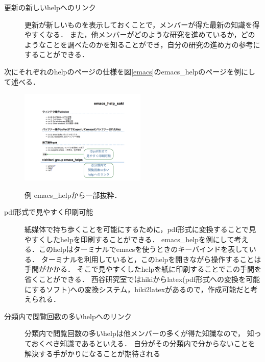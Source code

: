 \begin{description}
\item[更新の新しいhelpへのリンク]
更新が新しいものを表示しておくことで，メンバーが得た最新の知識を得やすくなる．
また，他メンバーがどのような研究を進めているか，どのようなことを調べたのかを知ることができ，自分の研究の進め方の参考にすることができる．
\end{description}

次にそれぞれのhelpのページの仕様を図\ref{emacs}のemacs\_helpのページを例にして述べる．
\begin{figure}[htbp]\begin{center}
\includegraphics[width=6cm,bb=0 0 600 800]{my_help2hiki_saki.015.png}
\caption{例 emacs\_helpから一部抜粋．}\label{emacs}
\label{default}\end{center}\end{figure}

\begin{description}

\item[pdf形式で見やすく印刷可能]
紙媒体で持ち歩くことを可能にするために，pdf形式に変換することで見やすくしたhelpを印刷することができる．
emacs\_helpを例にして考える．このhelpはターミナルでemacsを使うときのキーバインドを表している．
ターミナルを利用していると，このhelpを開きながら操作することは手間がかかる．
そこで見やすくしたhelpを紙に印刷することでこの手間を省くことができる．
西谷研究室ではhikiからlatex(pdf形式への変換を可能にするソフト)への変換システム，hiki2latexがあるので，作成可能だと考えられる．
\end{description}

\begin{description}
\item[分類内で閲覧回数の多いhelpへのリンク]
分類内で閲覧回数の多いhelpは他メンバーの多くが得た知識なので，
知っておくべき知識であるといえる．
自分がその分類内で分からないことを解決する手がかりになることが期待される
\end{description}
